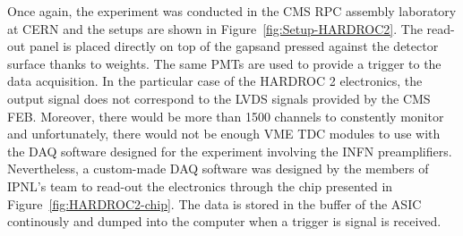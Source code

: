 	Once again, the experiment was conducted in the CMS RPC assembly laboratory at CERN and the setups are shown in Figure~\ref{fig:Setup-HARDROC2}. The read-out panel is placed directly on top of the gapsand pressed against the detector surface thanks to weights. The same PMTs are used to provide a trigger to the data acquisition. In the particular case of the HARDROC 2 electronics, the output signal does not correspond to the LVDS signals provided by the CMS FEB. Moreover, there would be more than 1500 channels to constently monitor and unfortunately, there would not be enough VME TDC modules to use with the DAQ software designed for the experiment involving the INFN preamplifiers. Nevertheless, a custom-made DAQ software was designed by the members of IPNL's team to read-out the electronics through the chip presented in Figure~\ref{fig:HARDROC2-chip}. The data is stored in the buffer of the ASIC continously and dumped into the computer when a trigger is signal is received.
	
\endgroup
	
